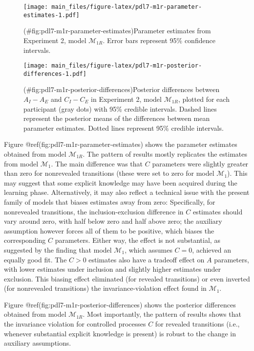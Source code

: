 \begin{appendix}
\begin{figure}
\centering
\texttt{[image: main\_files/figure-latex/pdl7-m1r-parameter-estimates-1.pdf]}
\caption{(\#fig:pdl7-m1r-parameter-estimates)Parameter estimates from
Experiment 2, model \(\mathcal{M}_{1R}\). Error bars represent 95\%
confidence intervals.}
\end{figure}

\begin{figure}
\centering
\texttt{[image: main\_files/figure-latex/pdl7-m1r-posterior-differences-1.pdf]}
\caption{(\#fig:pdl7-m1r-posterior-differences)Posterior differences
between \(A_I - A_E\) and \(C_I - C_E\) in Experiment 2, model
\(\mathcal{M}_{1R}\), plotted for each participant (gray dots) with 95\%
credible intervals. Dashed lines represent the posterior means of the
differences between mean parameter estimates. Dotted lines represent
95\% credible intervals.}
\end{figure}

Figure @ref(fig:pdl7-m1r-parameter-estimates) shows the parameter
estimates obtained from model \(\mathcal{M}_{1R}\). The pattern of
results mostly replicates the estimates from model \(\mathcal{M}_1\).
The main difference was that \(C\) parameters were slightly greater than
zero for nonrevealed transitions (these were set to zero for model
\(\mathcal{M}_1\)). This may suggest that some explicit knowledge may
have been acquired during the learning phase. Alternatively, it may also
reflect a technical issue with the present family of models that biases
estimates away from zero: Specifically, for nonrevealed transitions, the
inclusion-exclusion difference in \(C\) estimates should vary around
zero, with half below zero and half above zero; the auxiliary assumption
however forces all of them to be positive, which biases the
corresponding \(C\) parameters. Either way, the effect is not
substantial, as suggested by the finding that model \(\mathcal{M}_1\),
which assumes \(C=0\), achieved an equally good fit. The \(C>0\)
estimates also have a tradeoff effect on \(A\) parameters, with lower
estimates under inclusion and slightly higher estimates under exclusion.
This biasing effect eliminated (for revealed transitions) or even
inverted (for nonrevealed transitions) the invariance-violation effect
found in \(\mathcal{M}_1\).

Figure @ref(fig:pdl7-m1r-posterior-differences) shows the posterior
differences obtained from model \(\mathcal{M}_{1R}\). Most importantly,
the pattern of results shows that the invariance violation for
controlled processes \(C\) for revealed transitions (i.e., whenever
substantial explicit knowledge is present) is robust to the change in
auxiliary assumptions.


\end{appendix}
